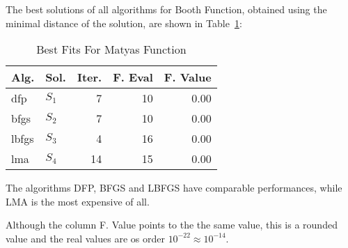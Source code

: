 
The best solutions of all algorithms for Booth Function, obtained using the minimal
distance of the solution, are shown in Table~\ref{solutions:matyas}:

\begin{table}[H]
\centering
\caption{Best Fits For Matyas Function}
\label{solutions:matyas}
\begin{tabular}{llrrr}
\toprule
 Alg. &    Sol. &  Iter. &  F. Eval &  F. Value \\
\midrule
  dfp & $S_{1}$ &      7 &       10 &      0.00 \\
 bfgs & $S_{2}$ &      7 &       10 &      0.00 \\
lbfgs & $S_{3}$ &      4 &       16 &      0.00 \\
  lma & $S_{4}$ &     14 &       15 &      0.00 \\
\bottomrule
\end{tabular}
\end{table}

The algorithms DFP, BFGS and LBFGS have comparable performances, while LMA
is the most expensive of all.

Although the column F. Value points to the the same value, this is a rounded value
and the real values are os order $10^{-22} \approx 10^{-14}$.

